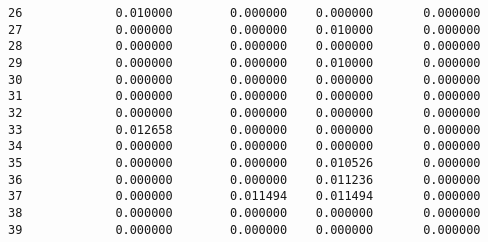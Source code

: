 \documentclass[11pt]{article}
\begin{document}
\begin{tcolorbox}[breakable, size=fbox, boxrule=.5pt, pad at break*=1mm, opacityfill=0]
\begin{Verbatim}[commandchars=\\\{\}]
26             0.010000        0.000000    0.000000       0.000000
27             0.000000        0.000000    0.010000       0.000000
28             0.000000        0.000000    0.000000       0.000000
29             0.000000        0.000000    0.010000       0.000000
30             0.000000        0.000000    0.000000       0.000000
31             0.000000        0.000000    0.000000       0.000000
32             0.000000        0.000000    0.000000       0.000000
33             0.012658        0.000000    0.000000       0.000000
34             0.000000        0.000000    0.000000       0.000000
35             0.000000        0.000000    0.010526       0.000000
36             0.000000        0.000000    0.011236       0.000000
37             0.000000        0.011494    0.011494       0.000000
38             0.000000        0.000000    0.000000       0.000000
39             0.000000        0.000000    0.000000       0.000000


\end{Verbatim}
\end{tcolorbox}
\end{document}
